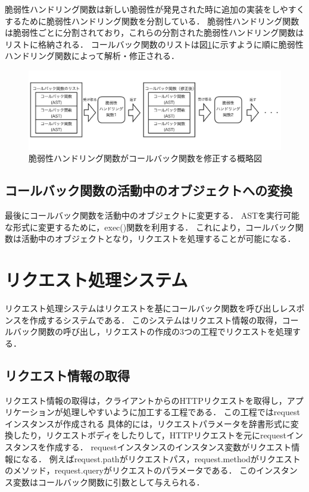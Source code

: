\documentclass[a4paper,12pt]{jreport}
\begin{document}
脆弱性ハンドリング関数は新しい脆弱性が発見された時に追加の実装をしやすくするために脆弱性ハンドリング関数を分割している．
脆弱性ハンドリング関数は脆弱性ごとに分割されており，これらの分割された脆弱性ハンドリング関数はリストに格納される．
コールバック関数のリストは図\ref{fig:vh_funcs}に示すように順に脆弱性ハンドリング関数によって解析・修正される．
\begin{figure}[ht]
  \begin{center}
    \includegraphics[clip, width=130mm]{./figures/splited_vhfunction.png}
    \caption{脆弱性ハンドリング関数がコールバック関数を修正する概略図}
    \label{fig:vh_funcs}
  \end{center}
\end{figure}

\subsection{コールバック関数の活動中のオブジェクトへの変換}
最後にコールバック関数を活動中のオブジェクトに変更する．
ASTを実行可能な形式に変更するために，exec()関数を利用する．
これにより，コールバック関数は活動中のオブジェクトとなり，リクエストを処理することが可能になる．

\section{リクエスト処理システム}
リクエスト処理システムはリクエストを基にコールバック関数を呼び出しレスポンスを作成するシステムである．
このシステムはリクエスト情報の取得，コールバック関数の呼び出し，リクエストの作成の3つの工程でリクエストを処理する．

\subsection{リクエスト情報の取得}
リクエスト情報の取得は，クライアントからのHTTPリクエストを取得し，アプリケーションが処理しやすいように加工する工程である．
この工程ではrequestインスタンスが作成される
具体的には，リクエストパラメータを辞書形式に変換したり，リクエストボディをしたりして，HTTPリクエストを元にrequestインスタンスを作成する．
requestインスタンスのインスタンス変数がリクエスト情報になる．
例えばrequest.pathがリクエストパス，request.methodがリクエストのメソッド，request.queryがリクエストのパラメータである．
このインスタンス変数はコールバック関数に引数として与えられる．
\end{document}
